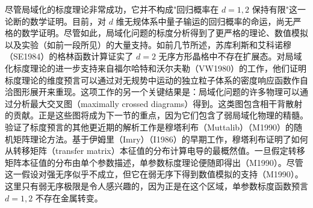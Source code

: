尽管局域化的标度理论非常成功，它并不构成"回归概率在 $d=1,2$ 保持有限"这一论断的数学证明。目前，对 $d$ 维无规体系中量子输运的回归概率的命运，尚无严格的数学证明。尽管如此，局域化问题的标度分析得到了更严格的理论、数值模拟以及实验（如前一段所见）的大量支持。如前几节所述，苏库利斯和艾科诺穆（SE1984）的格林函数计算证实了 $d=2$ 无序方形晶格中不存在扩展态。对局域化标度理论的进一步支持来自福尔哈特和沃尔夫勒（VW1980）的工作，他们证明标度理论的维度预言可以通过对无规势中运动的独立粒子体系的密度响应函数作自洽图形展开来重现。这项工作的另一个关键结果是：局域化问题的许多物理可以通过分析最大交叉图（maximally crossed diagrams）得到。这类图包含相干背散射的贡献。正是这些图将成为下一节的重点，因为它们包含了弱局域化物理的精髓。验证了标度预言的其他更近期的解析工作是穆塔利布（Muttalib）（M1990）的随机矩阵理论方法。基于伊姆里（Imry）（I1986）的早期工作，穆塔利布证明了如何从转移矩阵（transfer matrix）本征值的分布计算电导的最概然值。一旦假定转移矩阵本征值的分布由单个参数描述，单参数标度理论便随即得出（M1990）。尽管这一假设对强无序似乎不成立，但它在弱无序下得到数值模拟的支持（M1990）。这里只有弱无序极限是令人感兴趣的，因为正是在这个区域，单参数标度函数预言 $d=1,2$ 不存在金属转变。
